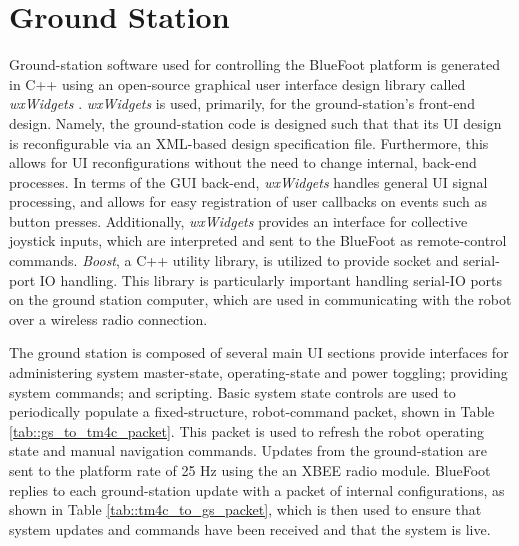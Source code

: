 	\section{Ground Station}
		
	Ground-station software used for controlling the BlueFoot platform is generated in C++ using an open-source graphical user interface design library called \emph{wxWidgets} \cite{WX_Website}. \emph{wxWidgets} is used, primarily, for the ground-station's front-end design. Namely, the ground-station code is designed such that that its UI design is reconfigurable via an XML-based design specification file. Furthermore, this allows for UI reconfigurations without the need to change internal, back-end processes. In terms of the GUI back-end, \emph{wxWidgets} handles general UI signal processing, and allows for easy registration of user callbacks on events such as button presses. Additionally, \emph{wxWidgets} provides an interface for collective joystick inputs, which are interpreted and sent to the BlueFoot as remote-control commands. \emph{Boost}, a C++ utility library, is utilized to provide socket and serial-port IO handling. This library is particularly important handling serial-IO ports on the ground station computer, which are used in communicating with the robot over a wireless radio connection.

	The ground station is composed of several main UI sections provide interfaces for administering system master-state, operating-state and power toggling; providing system commands; and scripting. Basic system state controls are used to periodically populate a fixed-structure, robot-command packet, shown in Table \ref{tab::gs_to_tm4c_packet}. This packet is used to refresh the robot operating state and manual navigation commands. Updates from the ground-station are sent to the platform rate of 25 Hz using the an XBEE radio module. BlueFoot replies to each ground-station update with a packet of internal configurations, as shown in Table \ref{tab::tm4c_to_gs_packet}, which is then used to ensure that system updates and commands have been received and that the system is live.

